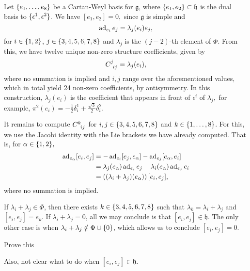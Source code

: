 Let \(\{e_1, \dots, e_8\}\) be a Cartan-Weyl basis for \(\mathfrak{g}\), where \(\{e_1, e_2\} \subset \mathfrak{h}\) is the dual basis to \(\{\epsilon^1, \epsilon^2\}.\) We have \([e_1,e_2] = 0,\) since \(\mathfrak{g}\) is simple and
\begin{equation*}
    \operatorname{ad}_{e_i}e_j = \lambda_{j}(e_i) e_j,
\end{equation*}
for \(i \in \{1,2\}\), \(j \in \{3,4,5,6,7,8\}\) and \(\lambda_j\) is the \((j-2)\)-th element of \(\Phi\). From this, we have twelve unique non-zero structure coefficients, given by
\begin{equation*}
    C\indices{^j_{ij}} = \lambda_{j}(e_i),
\end{equation*}
where no summation is implied and \(i,j\) range over the aforementioned values, which in total yield 24 non-zero coefficients, by antisymmetry. In this construction, \(\lambda_j(e_i)\) is the coefficient that appears in front of \(\epsilon^i\) of \(\lambda_j,\) for example, \(\pi^2(e_i) = -\frac{1}{2} \delta^1_i + \frac{\sqrt{3}}{2}\delta^2_i.\)

It remains to compute \(C\indices{^{k}_{ij}}\) for \(i,j \in \{3,4,5,6,7,8\}\) and \(k \in \{1,\dots,8\}\). For this, we use the Jacobi identity with the Lie brackets we have already computed. That is, for \(\alpha \in \{1,2\},\)
\begin{align*}
    \operatorname{ad}_{e_{\alpha}}[e_i, e_j] &= - \operatorname{ad}_{e_i}[e_j, e_{\alpha}] - \operatorname{ad}_{e_j}[e_{\alpha}, e_i]\\
                              &= \lambda_j(e_{\alpha})\operatorname{ad}_{e_i}e_j - \lambda_i(e_{\alpha})\operatorname{ad}_{e_j}e_i\\
                              &= \left((\lambda_i + \lambda_j)(e_{\alpha})\right)[e_i, e_j],
\end{align*}
where no summation is implied.

If \(\lambda_i + \lambda_j \in \Phi\), then there exists \(k \in \{3,4,5,6,7,8\}\) such that \(\lambda_k = \lambda_i + \lambda_j\) and \([e_i, e_j] = e_k.\) If \(\lambda_i + \lambda_j = 0\), all we may conclude is that \([e_i,e_j] \in \mathfrak{h}\). The only other case is when \(\lambda_i + \lambda_j \notin \Phi \cup \{0\}\), which allows us to conclude \([e_i,e_j]=0.\)

Prove this \todo

Also, not clear what to do when \([e_i, e_j] \in \mathfrak{h}.\) \todo
